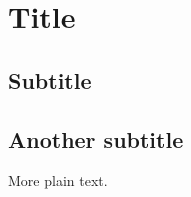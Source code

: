 \documentclass{jarticle}
\begin{document}
\section{Title}

\subsection{Subtitle}



\subsection{Another subtitle}

More plain text.
\end{document}
